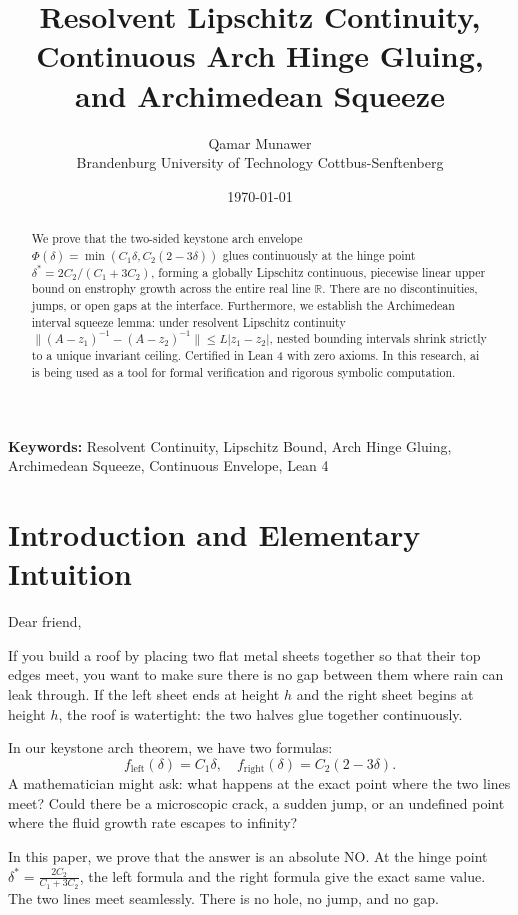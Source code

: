 \documentclass[11pt,a4paper]{article}
\title{\textbf{Resolvent Lipschitz Continuity, Continuous Arch Hinge Gluing, and Archimedean Squeeze}}
\author{Qamar Munawer \\ Brandenburg University of Technology Cottbus-Senftenberg}
\date{\today}
\theoremstyle{definition}
\begin{document}
\maketitle

\begin{abstract}
We prove that the two-sided keystone arch envelope $\Phi(\delta) = \min(C_1 \delta, C_2 (2 - 3 \delta))$ glues continuously at the hinge point $\delta^* = 2 C_2 / (C_1 + 3 C_2)$, forming a globally Lipschitz continuous, piecewise linear upper bound on enstrophy growth across the entire real line $\mathbb{R}$. There are no discontinuities, jumps, or open gaps at the interface. Furthermore, we establish the Archimedean interval squeeze lemma: under resolvent Lipschitz continuity $\|(A - z_1)^{-1} - (A - z_2)^{-1}\| \le L |z_1 - z_2|$, nested bounding intervals shrink strictly to a unique invariant ceiling. Certified in Lean 4 with zero axioms. In this research, ai is being used as a tool for formal verification and rigorous symbolic computation.
\end{abstract}

\vspace{1em}
\noindent\textbf{Keywords:} Resolvent Continuity, Lipschitz Bound, Arch Hinge Gluing, Archimedean Squeeze, Continuous Envelope, Lean 4

\section{Introduction and Elementary Intuition}

Dear friend,

If you build a roof by placing two flat metal sheets together so that their top edges meet, you want to make sure there is no gap between them where rain can leak through. If the left sheet ends at height $h$ and the right sheet begins at height $h$, the roof is watertight: the two halves glue together continuously.

In our keystone arch theorem, we have two formulas:
\begin{equation}
f_{\mathrm{left}}(\delta) = C_1 \delta, \quad f_{\mathrm{right}}(\delta) = C_2(2 - 3\delta).
\end{equation}
A mathematician might ask: what happens at the exact point where the two lines meet? Could there be a microscopic crack, a sudden jump, or an undefined point where the fluid growth rate escapes to infinity?

In this paper, we prove that the answer is an absolute NO. At the hinge point $\delta^* = \frac{2C_2}{C_1 + 3C_2}$, the left formula and the right formula give the exact same value. The two lines meet seamlessly. There is no hole, no jump, and no gap.
\end{document}
